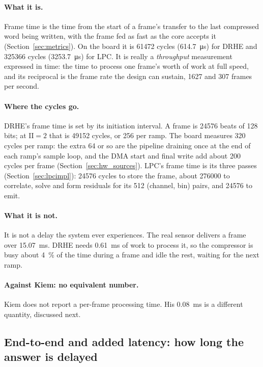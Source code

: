 \paragraph{What it is.} Frame time is the time from the start of a frame's
transfer to the last compressed word being written, with the frame fed as fast
as the core accepts it (Section~\ref{sec:metrics}). On the board it is
\num{61472} cycles (\SI{614.7}{\micro\second}) for DRHE and \num{325366}
cycles (\SI{3253.7}{\micro\second}) for LPC. It is really a
\emph{throughput} measurement expressed in time: the time to process one frame's
worth of work at full speed, and its reciprocal is the frame rate the design
can sustain, \num{1627} and \num{307} frames per second.

\paragraph{Where the cycles go.} DRHE's frame time is set by its initiation
interval. A frame is \num{24576} beats of 128 bits; at $\mathrm{II} = 2$ that is
\num{49152} cycles, or 256 per ramp. The board measures 320 cycles per ramp:
the extra 64 or so are the pipeline draining once at the end of each ramp's
sample loop, and the DMA start and final write add about 200 cycles per frame
(Section~\ref{sec:hw_sources}). LPC's frame time is its three passes
(Section~\ref{sec:lpcimpl}): \num{24576} cycles to store the frame, about
\num{276000} to correlate, solve and form residuals for its 512
(channel, bin) pairs, and \num{24576} to emit.

\paragraph{What it is not.} It is not a delay the system ever experiences. The
real sensor delivers a frame over \SI{15.07}{\milli\second}. DRHE needs
\SI{0.61}{\milli\second} of work to process it, so the compressor is busy about
\SI{4}{\percent} of the time during a frame and idle the rest, waiting for the
next ramp.

\paragraph{Against Kiem: no equivalent number.} Kiem does not report a
per-frame processing time. His \SI{0.08}{\milli\second} is a different
quantity, discussed next.

\subsection{End-to-end and added latency: how long the answer is delayed}
\label{sec:hw_addedlat}


